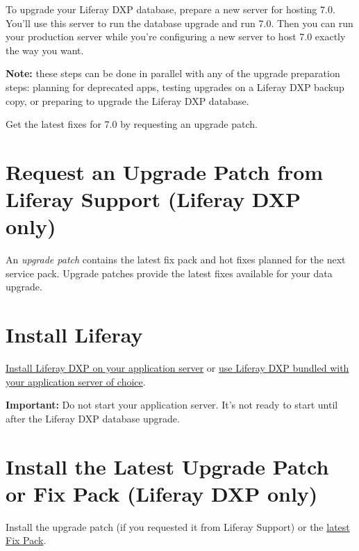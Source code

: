 To upgrade your Liferay DXP database, prepare a new server for hosting
7.0. You'll use this server to run the database upgrade and run 7.0.
Then you can run your production server while you're configuring a new
server to host 7.0 exactly the way you want.

\noindent\hrulefill

\textbf{Note:} these steps can be done in parallel with any of the
upgrade preparation steps: planning for deprecated apps, testing
upgrades on a Liferay DXP backup copy, or preparing to upgrade the
Liferay DXP database.

\noindent\hrulefill

Get the latest fixes for 7.0 by requesting an upgrade patch.

\section{Request an Upgrade Patch from Liferay Support (Liferay DXP
only)}\label{request-an-upgrade-patch-from-liferay-support-liferay-dxp-only}

An \emph{upgrade patch} contains the latest fix pack and hot fixes
planned for the next service pack. Upgrade patches provide the latest
fixes available for your data upgrade.

\section{Install Liferay}\label{install-liferay}

\href{/docs/7-2/deploy/-/knowledge_base/d/deploying-product}{Install
Liferay DXP on your application server} or
\href{/docs/7-2/deploy/-/knowledge_base/d/installing-product}{use
Liferay DXP bundled with your application server of choice}.

\noindent\hrulefill

\textbf{Important:} Do not start your application server. It's not ready
to start until after the Liferay DXP database upgrade.

\noindent\hrulefill

\section{Install the Latest Upgrade Patch or Fix Pack (Liferay DXP
only)}\label{install-the-latest-upgrade-patch-or-fix-pack-liferay-dxp-only}

Install the upgrade patch (if you requested it from Liferay Support) or
the
\href{https://help.liferay.com/hc/en-us/articles/360028810452-Patching-Liferay-DXP}{latest
Fix Pack}.

